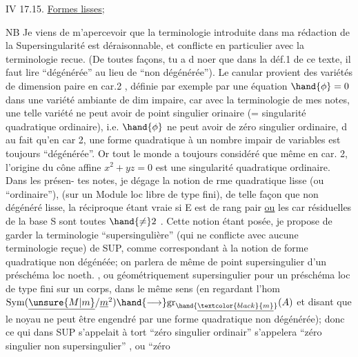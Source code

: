  

IV 17.15. \uline{Formes lisses};  

NB Je viens de m'apercevoir \hand{\textsuperscript{\unsure{$\dagger$}}}que la terminologie introduite dans
ma rédaction  de la Supersingularité est déraisonnable, et conflicte
en particulier avec la terminologie recue. (De toutes façons, tu a d\hand{\^{\textcolor{black}{u}}}
noer que dans la déf.1 de ce texte, il faut lire ``dégénérée'' au lieu de
``non dégénérée''). Le canular provient des variétés de dimension paire
en car.2 ,  définie par exemple par une équation $\hand{\phi}=0$
dans une variété ambiante de dim impaire, car avec la terminologie de mes
notes, une telle variété ne peut avoir de  point singulier
orinaire (= singularité quadratique ordinaire), i.e. $\hand{\phi}$ ne peut avoir
de zéro singulier ordinaire, d\hand{\^{\textcolor{black}{u}}} au fait qu'en car 2, une forme quadratique
à un nombre impair de variables est toujours ``dégénérée''. Or tout le
monde a toujours considéré que même en car. 2, l'origine du cône affine
$x^2 + yz = 0$ est une singularité quadratique ordinaire. Dans les présen-%
tes notes, je dégage la notion de rme quadratique lisse (ou ``ordinaire''),
(sur un Module loc libre de type fini), de telle façon que
non dégénéré \hand{$\Longrightarrow$} lisse, la réciproque étant vraie si E est de rang pair
\uline{ou} les car résiduelles de la base S sont toutes $\hand{\neq} 2$ . Cette notion étant
posée, je propose de garder la terminologie ``supersingulière'' (qui ne
conflicte avec aucune terminologie reçue)  de SUP,
comme correspondant à la notion de forme quadratique non dégénéée; on
parlera de même de point supersingulier d'un préschéma loc noeth. , ou
géométriquement supersingulier pour un préschéma loc de type fini sur un
corps, dans le même sens (en regardant l'hom $\mathrm{Sym}(\underline{\unsure{M|m}}/\underline{m}^2) \hand{\longrightarrow} \mathrm{gr}_{\hand{\underline{\textcolor{black}{m}}}}(A)$ et
 disant que le noyau ne peut être engendré par une forme quadratique
non dégénérée); donc ce qui dans SUP s'appelait à tort ``zéro singulier
ordinair'' s'appelera ``zéro singulier non supersingulier'' , ou ``zéro

